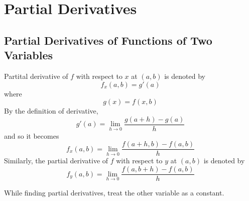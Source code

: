 
\section{Partial Derivatives}

\subsection{Partial Derivatives of Functions of Two Variables}

\begin{definition}
  Partital derivative of \(f\) with respect to \(x\) at \((a, b)\) is denoted by
  \[
    f_x(a, b) = g'(a)
  \]
  where
  \[
    g(x) = f(x, b)
  \]
  By the definition of derivative,
  \[
    g'(a) = \lim_{h \to 0} \frac{g(a + h) - g(a)}{h}
  \]
  and so it becomes
  \[
    f_x(a, b) = \lim_{h \to 0} \frac{f(a + h, b) - f(a, b)}{h}
  \]
  Similarly, the partial derivative of \(f\) with respect to \(y\) at \((a, b)\) is denoted by
  \[
    f_y(a, b) = \lim_{h \to 0} \frac{f(a, b + h) - f(a, b)}{h}
  \]
\end{definition}

\begin{remark}
  While finding partial derivatives, treat the other variable as a constant.
\end{remark}

